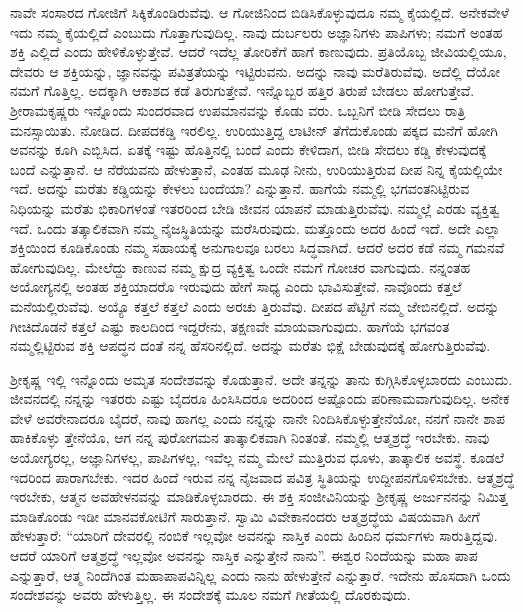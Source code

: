 ನಾವೇ ಸಂಸಾರದ ಗೋಜಿಗೆ ಸಿಕ್ಕಿಕೊಂಡಿರುವೆವು. ಆ ಗೋಜಿನಿಂದ ಬಿಡಿಸಿಕೊಳ್ಳುವುದೂ ನಮ್ಮ ಕೈಯಲ್ಲಿದೆ. ಅನೇಕವೇಳೆ ಇದು ನಮ್ಮ ಕೈಯಲ್ಲಿದೆ ಎಂಬುದು ಗೊತ್ತಾಗುವುದಿಲ್ಲ. ನಾವು ದುರ್ಬಲರು ಅಜ್ಞಾನಿಗಳು ಪಾಪಿಗಳು; ನಮಗೆ ಅಂತಹ ಶಕ್ತಿ ಎಲ್ಲಿದೆ ಎಂದು ಹೇಳಿಕೊಳ್ಳುತ್ತೇವೆ. ಆದರೆ ಇದೆಲ್ಲ ತೋರಿಕೆಗೆ ಹಾಗೆ ಕಾಣುವುದು. ಪ್ರತಿಯೊಬ್ಬ ಜೀವಿಯಲ್ಲಿಯೂ, ದೇವರು ಆ ಶಕ್ತಿಯನ್ನು, ಜ್ಞಾನವನ್ನು ಪವಿತ್ರತೆಯನ್ನು ಇಟ್ಟಿರುವನು. ಅದನ್ನು ನಾವು ಮರೆತಿರುವೆವು. ಅದೆಲ್ಲಿ ದೆಯೋ ನಮಗೆ ಗೊತ್ತಿಲ್ಲ. ಅದಕ್ಕಾಗಿ ಆಕಾಶದ ಕಡೆ ತಿರುಗುತ್ತೇವೆ. ಇನ್ನೊಬ್ಬರ ಹತ್ತಿರ ತಿರುಪೆ ಬೇಡಲು ಹೋಗುತ್ತೇವೆ. ಶ‍್ರೀರಾಮಕೃಷ್ಣರು ಇನ್ನೊಂದು ಸುಂದರವಾದ ಉಪಮಾನವನ್ನು ಕೊಡು ವರು. ಒಬ್ಬನಿಗೆ ಬೀಡಿ ಸೇದಲು ರಾತ್ರಿ ಮನಸ್ಸಾಯಿತು. ನೋಡಿದ. ದೀಪದಕಡ್ಡಿ ಇರಲಿಲ್ಲ. ಉರಿಯುತ್ತಿದ್ದ ಲಾಟೀನ್ ತೆಗೆದುಕೊಂಡು ಪಕ್ಕದ ಮನೆಗೆ ಹೋಗಿ ಅವನನ್ನು ಕೂಗಿ ಎಬ್ಬಿಸಿದ. ಏತಕ್ಕೆ ಇಷ್ಟು ಹೊತ್ತಿನಲ್ಲಿ ಬಂದೆ ಎಂದು ಕೇಳಿದಾಗ, ಬೀಡಿ ಸೇದಲು ಕಡ್ಡಿ ಕೇಳುವುದಕ್ಕೆ ಬಂದೆ ಎನ್ನುತ್ತಾನೆ. ಆ ನೆರೆಯವನು ಹೇಳುತ್ತಾನೆ, ಎಂತಹ ಮೂಢ ನೀನು, ಉರಿಯುತ್ತಿರುವ ದೀಪ ನಿನ್ನ ಕೈಯಲ್ಲಿಯೇ ಇದೆ. ಅದನ್ನು ಮರೆತು ಕಡ್ಡಿಯನ್ನು ಕೇಳಲು ಬಂದೆಯಾ? ಎನ್ನುತ್ತಾನೆ. ಹಾಗೆಯೆ ನಮ್ಮಲ್ಲಿ ಭಗವಂತನಿಟ್ಟಿರುವ ನಿಧಿಯನ್ನು ಮರೆತು ಭಿಕಾರಿಗಳಂತೆ ಇತರರಿಂದ ಬೇಡಿ ಜೀವನ ಯಾಪನೆ ಮಾಡುತ್ತಿರುವೆವು. ನಮ್ಮಲ್ಲೆ ಎರಡು ವ್ಯಕ್ತಿತ್ವ ಇದೆ. ಒಂದು ತತ್ಕಾಲಿಕವಾಗಿ ನಮ್ಮ ನೈಜಸ್ಥಿತಿಯನ್ನು ಮರೆಸಿರುವುದು. ಮತ್ತೊಂದು ಅದರ ಹಿಂದೆ ಇದೆ. ಅದೇ ಎಲ್ಲಾ ಶಕ್ತಿಯಿಂದ ಕೂಡಿಕೊಂಡು ನಮ್ಮ ಸಹಾಯಕ್ಕೆ ಅನುಗಾಲವೂ ಬರಲು ಸಿದ್ಧವಾಗಿದೆ. ಆದರೆ ಅದರ ಕಡೆ ನಮ್ಮ ಗಮನವೆ ಹೋಗುವುದಿಲ್ಲ. ಮೇಲೆದ್ದು ಕಾಣುವ ನಮ್ಮ ಕ್ಷುದ್ರ ವ್ಯಕ್ತಿತ್ವ ಒಂದೇ ನಮಗೆ ಗೋಚರ ವಾಗುವುದು. ನನ್ನಂತಹ ಅಯೋಗ್ಯನಲ್ಲಿ ಅಂತಹ ಶಕ್ತಿಯಾದರೊ ಇರುವುದು ಹೇಗೆ ಸಾಧ್ಯ ಎಂದು ಭಾವಿಸುತ್ತೇವೆ. ನಾವೊಂದು ಕತ್ತಲೆ ಮನೆಯಲ್ಲಿರುವೆವು. ಅಯ್ಯೊ ಕತ್ತಲೆ ಕತ್ತಲೆ ಎಂದು ಅರಚು ತ್ತಿರುವೆವು. ದೀಪದ ಪೆಟ್ಟಿಗೆ ನಮ್ಮ ಜೇಬಿನಲ್ಲಿದೆ. ಅದನ್ನು ಗೀಚಿದೊಡನೆ ಕತ್ತಲೆ ಎಷ್ಟು ಕಾಲದಿಂದ ಇದ್ದರೇನು, ತಕ್ಷಣವೇ ಮಾಯವಾಗುವುದು. ಹಾಗೆಯೆ ಭಗವಂತ ನಮ್ಮಲ್ಲಿಟ್ಟಿರುವ ಶಕ್ತಿ ಆಪದ್ಧನ ದಂತೆ ನನ್ನ ಹೆಸರಿನಲ್ಲಿದೆ. ಅದನ್ನು ಮರೆತು ಭಿಕ್ಷೆ ಬೇಡುವುದಕ್ಕೆ ಹೋಗುತ್ತಿರುವೆವು.

ಶ‍್ರೀಕೃಷ್ಣ ಇಲ್ಲಿ ಇನ್ನೊಂದು ಅಮೃತ ಸಂದೇಶವನ್ನು ಕೊಡುತ್ತಾನೆ. ಅದೇ ತನ್ನನ್ನು ತಾನು ಕುಗ್ಗಿಸಿಕೊಳ್ಳಬಾರದು ಎಂಬುದು. ಜೀವನದಲ್ಲಿ ನನ್ನನ್ನು ಇತರರು ಎಷ್ಟು ಬೈದರೂ ಹಿಂಸಿಸಿದರೂ ಅದರಿಂದ ಅಷ್ಟೊಂದು ಪರಿಣಾಮವಾಗುವುದಿಲ್ಲ. ಅನೇಕ ವೇಳೆ ಅವರೇನಾದರೂ ಬೈದರೆ, ನಾವು ಹಾಗಲ್ಲ ಎಂದು ನನ್ನನ್ನು ನಾನೇ ನಿಂದಿಸಿಕೊಳ್ಳುತ್ತೇನೆಯೋ, ನನಗೆ ನಾನೇ ಶಾಪ ಹಾಕಿಕೊಳ್ಳು ತ್ತೇನೆಯೊ, ಆಗ ನನ್ನ ಪುರೋಗಮನ ತಾತ್ಕಾಲಿಕವಾಗಿ ನಿಂತಂತೆ. ನಮ್ಮಲ್ಲಿ ಆತ್ಮಶ್ರದ್ಧೆ ಇರಬೇಕು. ನಾವು ಅಯೋಗ್ಯರಲ್ಲ, ಅಜ್ಞಾನಿಗಳಲ್ಲ, ಪಾಪಿಗಳಲ್ಲ, ಇವೆಲ್ಲ ನಮ್ಮ ಮೇಲೆ ಮುತ್ತಿರುವ ಧೂಳು, ತಾತ್ಕಾಲಿಕ ಅವಸ್ಥೆ. ಕೂಡಲೆ ಇದರಿಂದ ಪಾರಾಗಬೇಕು. ಇದರ ಹಿಂದೆ ಇರುವ ನನ್ನ ನೈಜವಾದ ಪವಿತ್ರ ಸ್ಥಿತಿಯನ್ನು ಉದ್ದೀಪನಗೊಳಿಸಬೇಕು. ಆತ್ಮಶ್ರದ್ಧೆ ಇರಬೇಕು, ಆತ್ಮನ ಅವಹೇಳನವನ್ನು ಮಾಡಿಕೊಳ್ಳಬಾರದು. ಈ ಶಕ್ತಿ ಸಂಜೀವಿನಿಯನ್ನು ಶ‍್ರೀಕೃಷ್ಣ ಅರ್ಜುನನನ್ನು ನಿಮಿತ್ತ ಮಾಡಿಕೊಂಡು ಇಡೀ ಮಾನವಕೋಟಿಗೆ ಸಾರುತ್ತಾನೆ. ಸ್ವಾಮಿ ವಿವೇಕಾನಂದರು ಆತ್ಮಶ್ರದ್ಧೆಯ ವಿಷಯವಾಗಿ ಹೀಗೆ ಹೇಳುತ್ತಾರೆ: “ಯಾರಿಗೆ ದೇವರಲ್ಲಿ ನಂಬಿಕೆ ಇಲ್ಲವೋ ಅವನನ್ನು ನಾಸ್ತಿಕ ಎಂದು ಹಿಂದಿನ ಧರ್ಮಗಳು ಸಾರುತ್ತಿದ್ದವು. ಆದರೆ ಯಾರಿಗೆ ಆತ್ಮಶ್ರದ್ಧೆ ಇಲ್ಲವೋ ಅವನನ್ನು ನಾಸ್ತಿಕ ಎನ್ನುತ್ತೇನೆ ನಾನು”. ಈಶ್ವರ ನಿಂದೆಯನ್ನು ಮಹಾ ಪಾಪ ಎನ್ನುತ್ತಾರೆ, ಆತ್ಮ ನಿಂದೆಗಿಂತ ಮಹಾಪಾಪವಿನ್ನಿಲ್ಲ ಎಂದು ನಾನು ಹೇಳುತ್ತೇನೆ ಎನ್ನುತ್ತಾರೆ. ಇದೇನು ಹೊಸದಾಗಿ ಒಂದು ಸಂದೇಶವನ್ನು ಅವರು ಹೇಳುತ್ತಿಲ್ಲ. ಈ ಸಂದೇಶಕ್ಕೆ ಮೂಲ ನಮಗೆ ಗೀತೆಯಲ್ಲಿ ದೊರಕುವುದು.

